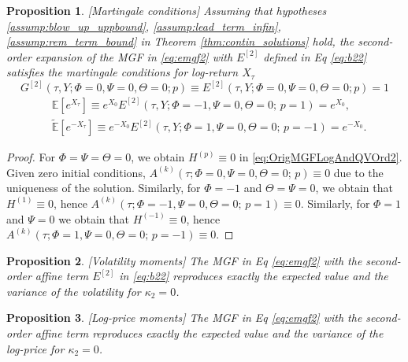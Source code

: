 \documentclass[pdftex,11pt,a4paper] {article}
\newtheorem{proposition}{Proposition}[section]
\begin{document}
\begin{proposition}\label{pr:mart2} [Martingale conditions] Assuming that hypotheses \ref{assump:blow_up_uppbound},  \ref{assump:lead_term_infin}, \ref{assump:rem_term_bound} in Theorem \ref{thm:contin_solutions} hold, the second-order expansion of the MGF in \eqref{eq:emgf2} with $E^{[2]}$ defined in Eq \eqref{eq:b22} satisfies the martingale conditions for log-return $X_\tau$
\begin{equation}\label{eq:mart21}
G^{[2]}(\tau,Y; \Phi=0,\Psi=0,\Theta=0;p) \equiv E^{[2]}(\tau,Y; \Phi=0,\Psi=0,\Theta=0;p) =1
\end{equation}
\begin{equation}\label{eq:mart22}
\begin{split}
&\mathbb{E}\left[e^{X_\tau}\right] \equiv e^{X_0} E^{[2]}(\tau,Y; \Phi=-1,\Psi=0,\Theta=0;\,p=1)=e^{X_0},\\
&\tilde{\mathbb{E}}\left[e^{-X_\tau}\right] \equiv e^{-X_0} E^{[2]}(\tau,Y; \Phi=1,\Psi=0,\Theta=0;\,p=-1)=e^{-X_0}.
\end{split}
\end{equation}
\end{proposition}


\begin{proof}
For $\Phi=\Psi=\Theta=0$, we obtain $H^{(p)}\equiv 0$ in \eqref{eq:OrigMGFLogAndQVOrd2}. Given zero initial conditions, $A^{(k)}(\tau;\Phi=0,\Psi=0,\Theta=0;\,p)\equiv 0$ due to the uniqueness of the solution. Similarly, for $\Phi=-1$ and $\Theta=\Psi=0$, we obtain that $H^{(1)}\equiv 0$, hence $A^{(k)}(\tau;\Phi=-1,\Psi=0,\Theta=0;\,p=1)\equiv 0$. 
Similarly, for $\Phi=1$ and $\Psi=0$ we obtain that $H^{(-1)}\equiv 0$, hence $A^{(k)}(\tau;\Phi=1,\Psi=0,\Theta=0;\,p=-1)\equiv 0$. 
\end{proof}


\begin{proposition}\label{pr:volmoment} [Volatility moments] The MGF in Eq \eqref{eq:emgf2} with  the second-order affine term $E^{[2]}$ in \eqref{eq:b22} reproduces exactly the expected value and the variance of the volatility for $\kappa_{2}=0$.
\end{proposition}


\begin{proposition}\label{pr:logmoment} [Log-price moments] The MGF in Eq \eqref{eq:emgf2} with the second-order affine term reproduces exactly the expected value and the variance of the log-price for $\kappa_{2}=0$.
\end{proposition}
\end{document}
